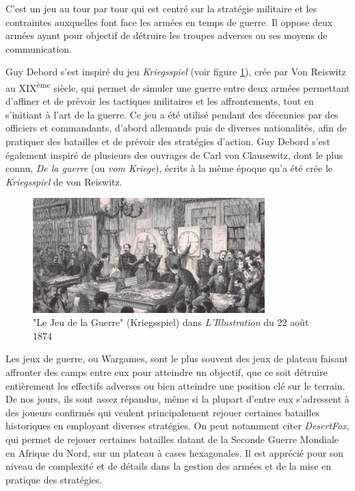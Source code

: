 \documentclass[a4paper]{report}
\begin{document}
C'est un jeu au tour par tour qui est centré sur la stratégie militaire et les contraintes auxquelles font face les armées en temps de guerre.
Il oppose deux armées ayant pour objectif de détruire les troupes adverses ou ses moyens de communication. 

Guy Debord s'est inspiré du jeu {\it Kriegsspiel} (voir figure \ref{fig:illu}), crée par Von Reiswitz au XIX\textsuperscript{ème} siècle, qui permet de simuler une guerre entre deux armées permettant d'affiner et de prévoir les tactiques militaires et les affrontements, tout en s'initiant à l'art de la guerre. Ce jeu a été utilisé pendant des décennies par des officiers et commandants, d'abord allemands puis de diverses nationalités, afin de pratiquer des batailles et de prévoir des stratégies d'action. Guy Debord s'est également inspiré de plusieurs des ouvrages de Carl von Clausewitz, dont le plus connu, {\it De la guerre} (ou {\it vom Kriege})\cite{vomkriege}, écrits à la même époque qu'a été crée le {\it Kriegsspiel} de von Reiswitz\cite{kriegsspiel}.

\begin{figure}[H]
\centering
\label{fig:illu}
\includegraphics[width=0.8\textwidth]{illujdg}
\caption{"Le Jeu de la Guerre" (Kriegsspiel) dans {\it L'Illustration} du 22 août 1874}
\end{figure}

Les jeux de guerre, ou Wargames, sont le plus souvent des jeux de plateau faisant affronter des camps entre eux pour atteindre un objectif, que ce soit détruire entièrement les effectifs adverses ou bien atteindre une position clé sur le terrain. 
\newpage
De nos jours, ils sont assez répandus, même si la plupart d'entre eux s'adressent à des joueurs confirmés qui veulent principalement rejouer certaines batailles historiques en employant diverses stratégies. On peut notamment citer \textit{DesertFox}, qui permet de rejouer certaines batailles datant de la Seconde Guerre Mondiale en Afrique du Nord, sur un plateau à cases hexagonales. Il est apprécié pour son niveau de complexité et de détails dans la gestion des armées et de la mise en pratique des stratégies.
\end{document}

